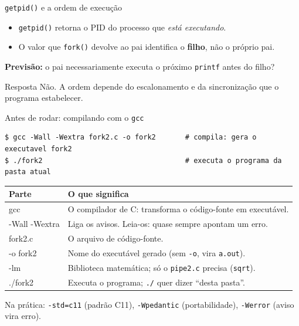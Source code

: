 \documentclass[aspectratio=169]{beamer}
\begin{document}
\begin{frame}{\texttt{getpid()} e a ordem de execução}
\begin{itemize}
    \item \texttt{getpid()} retorna o PID do processo que \emph{está executando}.
    \item O valor que \texttt{fork()} devolve ao pai identifica o \textbf{filho}, não o próprio pai.
\end{itemize}

\vspace{1em}
\textbf{Previsão:} o pai necessariamente executa o próximo \texttt{printf} antes do filho?

\pause
\begin{exampleblock}{Resposta}
Não. A ordem depende do escalonamento e da sincronização que o programa estabelecer.
\end{exampleblock}
\end{frame}

\begin{frame}[fragile]{Antes de rodar: compilando com o \texttt{gcc}}
\begin{lstlisting}[style=terminal]
$ gcc -Wall -Wextra fork2.c -o fork2       # compila: gera o executavel fork2
$ ./fork2                                  # executa o programa da pasta atual
\end{lstlisting}

\begin{center}
\footnotesize
\begin{tabular}{@{}>{\ttfamily}lp{10cm}@{}}
\toprule
\textrm{\textbf{Parte}} & \textbf{O que significa} \\
\midrule
gcc & O compilador de C: transforma o código-fonte em executável. \\
-Wall -Wextra & Liga os avisos. Leia-os: quase sempre apontam um erro. \\
fork2.c & O arquivo de código-fonte. \\
-o fork2 & Nome do executável gerado (sem \texttt{-o}, vira \texttt{a.out}). \\
-lm & Biblioteca matemática; só o \texttt{pipe2.c} precisa (\texttt{sqrt}). \\
./fork2 & Executa o programa; \texttt{./} quer dizer ``desta pasta''. \\
\bottomrule
\end{tabular}
\end{center}

\footnotesize Na prática: \texttt{-std=c11} (padrão C11), \texttt{-Wpedantic} (portabilidade), \texttt{-Werror} (aviso vira erro).
\end{frame}
\end{document}
